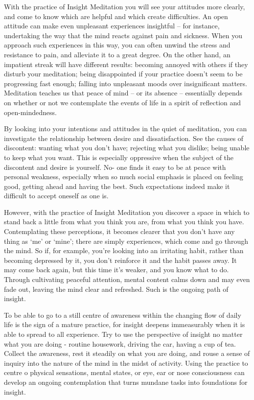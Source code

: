 
With the practice of Insight Meditation you will see your attitudes more
clearly, and come to know which are helpful and which create
difficulties. An open attitude can make even unpleasant experiences
insightful -- for instance, undertaking the way that the mind reacts
against pain and sickness. When you approach such experiences in this
way, you can often unwind the stress and resistance to pain, and
alleviate it to a great degree. On the other hand, an impatient streak
will have different results: becoming annoyed with others if they
disturb your meditation; being disappointed if your practice doesn't
seem to be progressing fast enough; falling into unpleasant moods over
insignificant matters. Meditation teaches us that peace of mind -- or
its absence -- essentially depends on whether or not we contemplate the
events of life in a spirit of reflection and open-mindedness.

By looking into your intentions and attitudes in the quiet of
meditation, you can investigate the relationship between desire and
dissatisfaction. See the causes of discontent: wanting what you don't
have; rejecting what you dislike; being unable to keep what you want.
This is especially oppressive when the subject of the discontent and
desire is yourself. No- one finds it easy to be at peace with personal
weakness, especially when so much social emphasis is placed on feeling
good, getting ahead and having the best. Such expectations indeed make
it difficult to accept oneself as one is.

However, with the practice of Insight Meditation you discover a space in
which to stand back a little from what you think you are, from what you
think you have. Contemplating these perceptions, it becomes clearer that
you don't have any thing as `me' or `mine'; there are simply
experiences, which come and go through the mind. So if, for example,
you're looking into an irritating habit, rather than becoming depressed
by it, you don't reinforce it and the habit passes away. It may come
back again, but this time it's weaker, and you know what to do. Through
cultivating peaceful attention, mental content calms down and may even
fade out, leaving the mind clear and refreshed. Such is the ongoing path
of insight.

To be able to go to a still centre of awareness within the changing flow
of daily life is the sign of a mature practice, for insight deepens
immeasurably when it is able to spread to all experience. Try to use the
perspective of insight no matter what you are doing - routine housework,
driving the car, having a cup of tea. Collect the awareness, rest it
steadily on what you are doing, and rouse a sense of inquiry into the
nature of the mind in the midst of activity. Using the practice to
centre o physical sensations, mental states, or eye, ear or nose
consciousness can develop an ongoing contemplation that turns mundane
tasks into foundations for insight.

